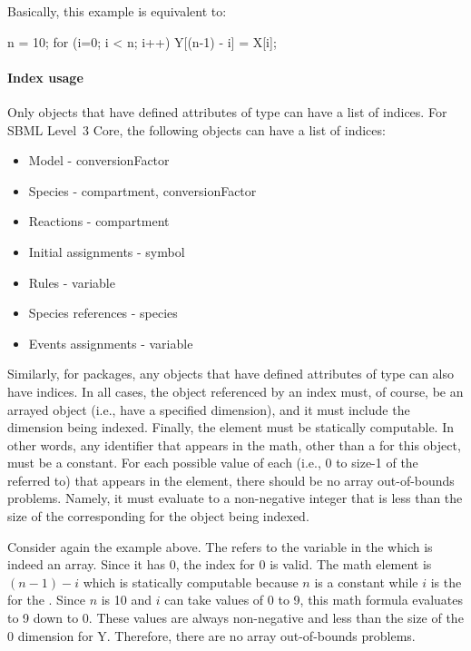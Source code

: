 Basically, this example is equivalent to:

\begin{example}
n = 10;
for (i=0; i < n; i++) {
    Y[(n-1) - i] = X[i];
}
\end{example}

\paragraph{Index usage}

Only objects that have defined attributes of  type can have a list of indices.  For SBML Level~3 Core, the following objects can have a list of indices:
\begin{itemize}
\item Model - conversionFactor
\item Species - compartment, conversionFactor
\item Reactions - compartment
\item Initial assignments - symbol
\item Rules - variable
\item Species references - species
\item Events assignments - variable
\end{itemize}
Similarly, for packages, any objects that have defined attributes of  type can also have indices.  In all cases, the object referenced by an index must, of course, be an arrayed object (i.e., have a specified dimension), and it must include the dimension being indexed.
Finally, the  element must be statically computable.  In other words, any identifier that appears in the math, other than a \Dimension {} for this object, must be a constant.  For each possible value of each \Dimension {} (i.e., 0 to size-1 of the \Dimension referred to) that appears in the  element, there should be no array out-of-bounds problems.  Namely, it must evaluate to a non-negative integer that is less than the size of the corresponding \Dimension for the object being indexed.  

Consider again the example above.  The \Index refers to the variable in the \AssignmentRule which is indeed an array.  Since it has  0, the index for  0 is valid.  The math element is $(n-1) - i$ which is statically computable because $n$ is a constant \Parameter while $i$ is the \Dimension {} for the \AssignmentRule.  Since $n$ is 10 and $i$ can take values of 0 to 9, this math formula evaluates to 9 down to 0.  These values are always non-negative and less than the size of the 0 dimension for Y.  Therefore, there are no array out-of-bounds problems.

